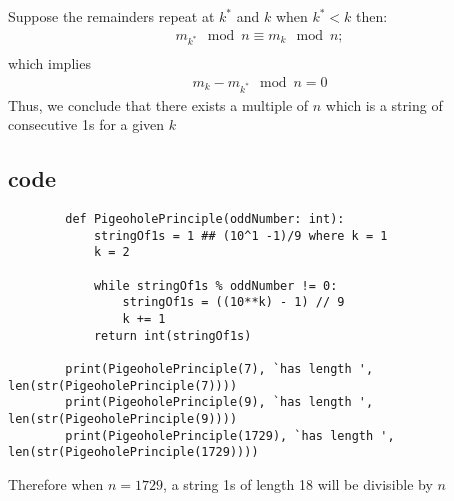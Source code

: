 \documentclass[10pt]{exam}
\begin{document}
\begin{parts}
\begin{customsolutionbox}
        Suppose the remainders repeat at $k^{*}$ and $k$ when $k^{*} < k$ then:
        \begin{gather}
            m_{k^{*}} \mod n \equiv m_{k} \mod n; \\
        \end{gather}
        which implies
        \begin{gather}
            m_{k} - m_{k^{*}} \mod n = 0
        \end{gather}
        Thus, we conclude that there exists a multiple of $n$ which is a string of consecutive 1s for a given $k$
    \end{customsolutionbox}

    \subsection{code}
    \begin{verbatim}
        def PigeoholePrinciple(oddNumber: int):
            stringOf1s = 1 ## (10^1 -1)/9 where k = 1
            k = 2

            while stringOf1s % oddNumber != 0:
                stringOf1s = ((10**k) - 1) // 9
                k += 1
            return int(stringOf1s)

        print(PigeoholePrinciple(7), `has length ', len(str(PigeoholePrinciple(7))))
        print(PigeoholePrinciple(9), `has length ', len(str(PigeoholePrinciple(9))))
        print(PigeoholePrinciple(1729), `has length ', len(str(PigeoholePrinciple(1729))))
    \end{verbatim}

    Therefore when $n = 1729$, a string 1s of length 18 will be divisible by $n$
\end{parts}
\end{document}
